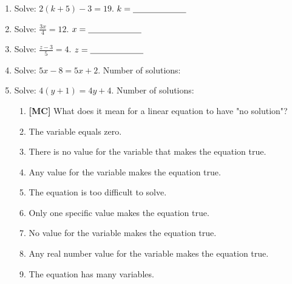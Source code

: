 \documentclass[12pt, letterpaper, fleqn]{article}
\newcommand{\blank}{\underline{\hspace{2.2cm}}}
\begin{document}
\begin{enumerate}[itemsep=2.5cm, leftmargin=0.6cm]
\begin{enumerate}[itemsep=2.5cm, leftmargin=0.6cm, resume]
\item Solve: $2(k + 5) - 3 = 19$.
    \vspace{1cm}
    $k = \blank$
\item Solve: $\frac{3x}{4} = 12$.
    \vspace{1cm}
    $x = \blank$
\item Solve: $\frac{z - 3}{5} = 4$.
    \vspace{1cm}
    $z = \blank$
\item Solve: $5x - 8 = 5x + 2$.
    \vspace{1cm}
    Number of solutions: \blank
\item Solve: $4(y + 1) = 4y + 4$.
    \vspace{1cm}
    Number of solutions: \blank

    \begin{enumerate}[label=\Alph*)]
\item \textbf{[MC]} What does it mean for a linear equation to have "no solution"?
\item The variable equals zero.
\item There is no value for the variable that makes the equation true.
\item Any value for the variable makes the equation true.
\item The equation is too difficult to solve.

\item Only one specific value makes the equation true.
\item No value for the variable makes the equation true.
\item Any real number value for the variable makes the equation true.
\item The equation has many variables.
\end{enumerate}

\end{enumerate}
\end{enumerate}
\end{document}
